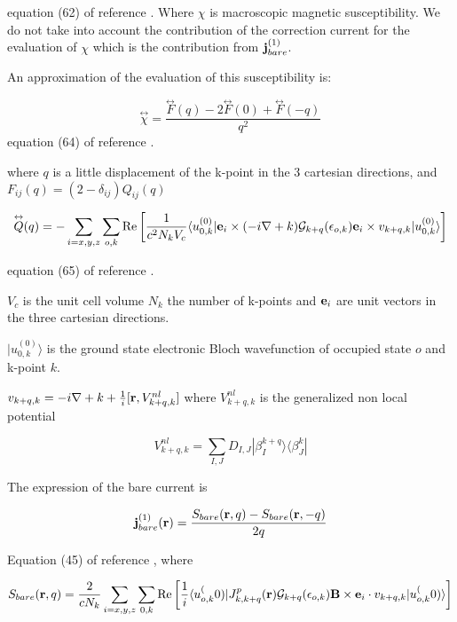 \documentclass[11pt, a4paper]{article}
\begin{document}
equation (62) of reference \cite{PRB_GIPAW}.
Where $\chi$ is macroscopic magnetic susceptibility. We do not take
into account the contribution of the correction current for the
evaluation of $\chi$ which is the contribution from ${\bf
  j}_{bare}^{(1)}$.

An approximation of the evaluation of this susceptibility is:

\begin{equation}
\overset{\leftrightarrow}{\chi}=\frac{\overset{\leftrightarrow}{F}(q)
  -2 \overset{\leftrightarrow}{F}(0)
  +\overset{\leftrightarrow}{F}(-q)} {q^2}
\label{chi}
\end{equation}
equation (64) of reference \cite{PRB_GIPAW}.

where $q$ is a little displacement of the k-point in the 3 cartesian
directions, and $F_{ij}(q)=(2-\delta_{ij}) Q_{ij}(q)$

\begin{equation}
\overset{\leftrightarrow}{Q}(q)=-\sum_{i=x,y,z} \sum_{o,k} {\rm
  Re}\left[\frac{1}{c^2N_kV_c} 
\langle u^{(0)}_{0,k}|{\bf e}_i\times(-i\nabla +
  k)\mathcal{G}_{k+q}(\epsilon_{o,k}){\bf e}_i\times v_{k+q,k}|
u^{(0)}_{0,k} \rangle \right]
\label{Qchi}
\end{equation}

equation (65) of reference \cite{PRB_GIPAW}.

$V_c$ is the unit cell volume $N_k$ the number of k-points and ${\bf
  e}_i$ are unit vectors in the three cartesian directions.

$|u^{(0)}_{0,k} \rangle$ is the ground state electronic Bloch
wavefunction of occupied state $o$ and k-point $k$.

$ v_{k+q,k}= -i \nabla + k + \frac{1}{i}[{\bf r}, V_{k+q,k}^{nl}] $
where $V_{k+q,k}^{nl}$ is the generalized non local potential

\begin{equation}
V_{k+q,k}^{nl}= \sum_{I,J} D_{I,J} |\beta_I^{k+q} \rangle \langle
\beta_J^k |
\end{equation}


The expression of the bare current is

\begin{equation}
{\bf j}_{bare}^{(1)}({\bf r})=\frac{S_{bare}({\bf r},q)-S_{bare}({\bf
    r},-q)} {2q}
\label{jbare}
\end{equation}

Equation (45) of reference \cite{PRB_GIPAW}, where

\begin{equation}
S_{bare}({\bf r},q)=\frac{2}{cN_k}\sum_{i=x,y,z}\sum_{0,k} {\rm
  Re}\left[ \frac{1}{i} \langle u_{o,k}^(0)|J^p_{k,k+q}({\bf r})
\mathcal{G}_{k+q}(\epsilon_{o,k}){\bf B}\times{\bf e}_i\cdot v_{k+q,k} 
|u_{o,k}^(0)\rangle \right]
\end{equation}
\end{document}
